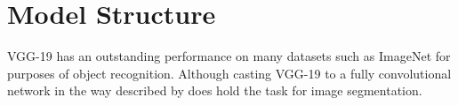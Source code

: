 \documentclass[10pt,twocolumn,letterpaper]{article}
\begin{document}
\section{Model Structure}
VGG-19 has an outstanding performance on many datasets such as ImageNet\cite{Cordts2016Cityscapes} for purposes of object recognition. Although casting VGG-19\cite{Cordts2016Cityscapes} to a fully convolutional network in the way described by \cite{Cordts2016Cityscapes} does hold the task for image segmentation.



{\small


}
\end{document}
